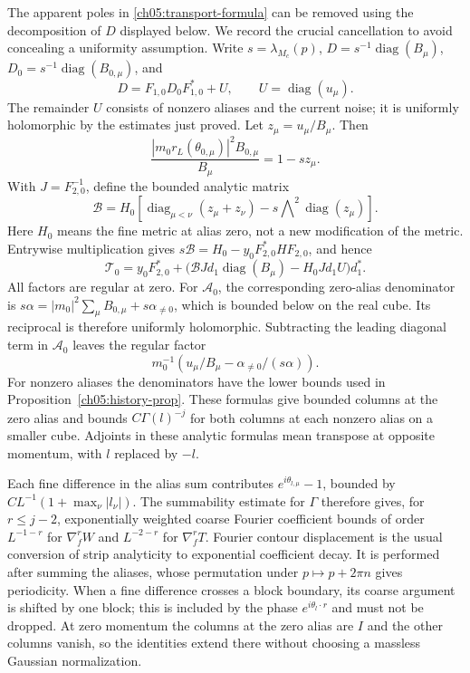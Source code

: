 The apparent poles in \eqref{ch05:transport-formula} can be
removed using the decomposition of $D$ displayed below. We record the
crucial cancellation to avoid concealing a uniformity assumption.
Write $s=\lambda_{M_c}(p)$, $D=s^{-1}\operatorname{diag}(B_\mu)$,
$D_0=s^{-1}\operatorname{diag}(B_{0,\mu})$, and
\[
 D=F_{1,0}D_0F_{1,0}^*+U,\qquad U=\operatorname{diag}(u_\mu).
\]
The remainder $U$ consists of nonzero aliases and the current
noise; it is uniformly holomorphic by the estimates just proved.
Let $z_\mu=u_\mu/B_\mu$. Then
\[
 \frac{|m_0r_L(\theta_{0,\mu})|^2B_{0,\mu}}{B_\mu}
                      =1-sz_\mu .
\]
With $J=F_{2,0}^{-1}$, define the bounded analytic matrix
\[
 \mathcal B=H_0\left[
       \operatorname{diag}_{\mu<\nu}(z_\mu+z_\nu)
                    -s\bigwedge\nolimits^2\operatorname{diag}(z_\mu)
                         \right].
\]
Here $H_0$ means the fine metric at alias zero, not a new
modification of the metric. Entrywise multiplication gives
$s\mathcal B=H_0-y_0F_{2,0}^*HF_{2,0}$, and hence
\[
 \mathcal T_0=y_0F_{2,0}^*
   +\bigl(\mathcal B Jd_1\operatorname{diag}(B_\mu)
                                -H_0Jd_1U\bigr)d_1^*.
\]
All factors are regular at zero. For $\mathcal A_0$, the
corresponding zero-alias denominator is
$s\alpha=|m_0|^2\sum_\mu B_{0,\mu}+s\alpha_{\ne0}$,
which is bounded below on the real cube. Its reciprocal is
therefore uniformly holomorphic. Subtracting the leading
diagonal term in $\mathcal A_0$ leaves the regular factor
\[
 m_0^{-1}\left(u_\mu/B_\mu-\alpha_{\ne0}/(s\alpha)\right).
\]
For nonzero aliases the denominators have the lower bounds
used in Proposition~\ref{ch05:history-prop}.
These formulas give bounded columns at the zero alias and bounds
$C\Gamma(l)^{-j}$ for both columns at each nonzero alias on a smaller cube.
Adjoints in these analytic formulas mean transpose at opposite
momentum, with $l$ replaced by $-l$.

Each fine difference in the alias sum contributes
$e^{i\theta_{l,\mu}}-1$, bounded by
$CL^{-1}(1+\max_\nu|l_\nu|)$.
The summability estimate for $\Gamma$ therefore gives, for
$r\le j-2$, exponentially weighted coarse Fourier coefficient
bounds of order $L^{-1-r}$ for $\nabla_f^rW$ and $L^{-2-r}$
for $\nabla_f^rT$. Fourier contour displacement is the usual
conversion of strip analyticity to exponential coefficient
decay. It is performed after summing the aliases, whose
permutation under $p\mapsto p+2\pi n$ gives periodicity.
When a fine difference crosses a block boundary, its coarse
argument is shifted by one block; this is included by the phase
$e^{i\theta_l\cdot r}$ and must not be dropped.
At zero momentum the columns at the zero alias are $I$ and the other
columns vanish, so the identities extend there without choosing
a massless Gaussian normalization.

